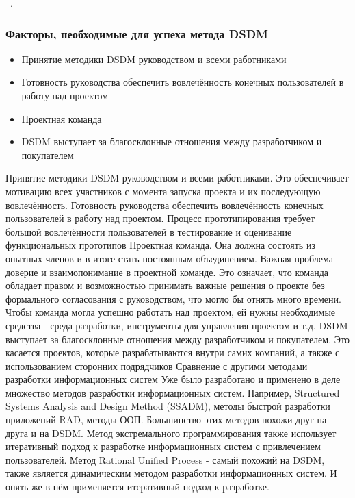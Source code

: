 \documentclass{../industrial-development}
\begin{document}
~\cite{Fowler}.


\begin{frame} \frametitle{Факторы, необходимые для успеха метода DSDM}
	\begin{itemize}
	\item Принятие методики DSDM руководством и всеми работниками
	\item Готовность руководства обеспечить вовлечённость конечных пользователей в работу над проектом
	\item Проектная команда
	\item DSDM выступает за благосклонные отношения между разработчиком и покупателем
	\end{itemize}	
\end{frame}

\lecturenotes
Принятие методики DSDM руководством и всеми работниками. Это обеспечивает мотивацию всех участников с момента запуска проекта и их последующую вовлечённость. 
Готовность руководства обеспечить вовлечённость конечных пользователей в работу над проектом. Процесс прототипирования требует большой вовлечённости пользователей в тестирование и оценивание функциональных прототипов 
Проектная команда. Она должна состоять из опытных членов и в итоге стать постоянным объединением. Важная проблема - доверие и взаимопонимание в проектной команде. Это означает, что команда обладает правом и возможностью принимать важные решения о проекте без формального согласования с руководством, что могло бы отнять много времени. Чтобы команда могла успешно работать над проектом, ей нужны необходимые средства - среда разработки, инструменты для управления проектом и т.д. 
DSDM выступает за благосклонные отношения между разработчиком и покупателем. Это касается проектов, которые разрабатываются внутри самих компаний, а также с использованием сторонних подрядчиков 
Сравнение с другими методами разработки информационных систем 
Уже было разработано и применено в деле множество методов разработки информационных систем. Например, Structured Systems Analysis and Design Method (SSADM), методы быстрой разработки приложений RAD, методы ООП. Большинство этих методов похожи друг на друга и на DSDM. 
Метод экстремального программирования также использует итеративный подход к разработке информационных систем с привлечением пользователей. 
Метод Rational Unified Process - самый похожий на DSDM, также является динамическим методом разработки информационных систем. И опять же в нём применяется итеративный подход к разработке. 
\end{document}
